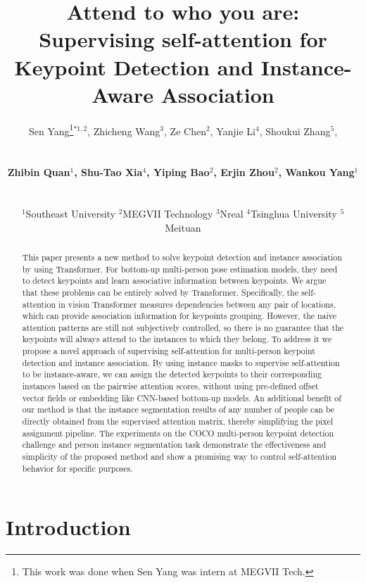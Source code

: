 \documentclass{article} \usepackage{iclr_conference,times}
\title{Attend to who you are: Supervising self-attention for Keypoint Detection and Instance-Aware Association}
\author{
		\centerline{Sen Yang\thanks{This work was done when Sen Yang was intern at MEGVII Tech.}$^{*1,2}$, Zhicheng Wang$^{3}$, Ze Chen$^{2}$, Yanjie Li$^{4}$, Shoukui Zhang$^{5}$,}\\
		 \centerline{\textbf{Zhibin Quan$^{1}$, Shu-Tao Xia$^{4}$, Yiping Bao$^{2}$, Erjin Zhou$^{2}$, Wankou Yang$^{1}$}}\\[1.mm]
		 \centerline{$^{1}$Southeast University  $^{2}$MEGVII Technology  $^{3}$Nreal  $^{4}$Tsinghua University  $^{5}$Meituan}
	}
\begin{document}
\maketitle

\begin{abstract}

This paper presents a new method to solve keypoint detection and instance association by using Transformer. For bottom-up multi-person pose estimation models, they need to detect keypoints and learn associative information between keypoints. 
We argue that these problems can be entirely solved by Transformer.
Specifically, the self-attention in vision Transformer measures dependencies between any pair of locations, which can provide association information for keypoints grouping.
However, the naive attention patterns are still not subjectively controlled, so there is no guarantee that the keypoints will always attend to the instances to which they belong.
To address it we propose a novel approach of supervising self-attention for multi-person keypoint detection and instance association.
By using instance masks to supervise self-attention to be instance-aware, we can assign the detected keypoints to their corresponding instances based on the pairwise attention scores, without using pre-defined offset vector fields or embedding like CNN-based bottom-up models.
An additional benefit of our method is that the instance segmentation results of any number of people can be directly obtained from the supervised attention matrix, thereby simplifying the pixel assignment pipeline.
The experiments on the COCO multi-person keypoint detection challenge and person instance segmentation task demonstrate the effectiveness and simplicity of the proposed method and show a promising way to control self-attention behavior for specific purposes.



\end{abstract}




\section{Introduction}
\end{document}
